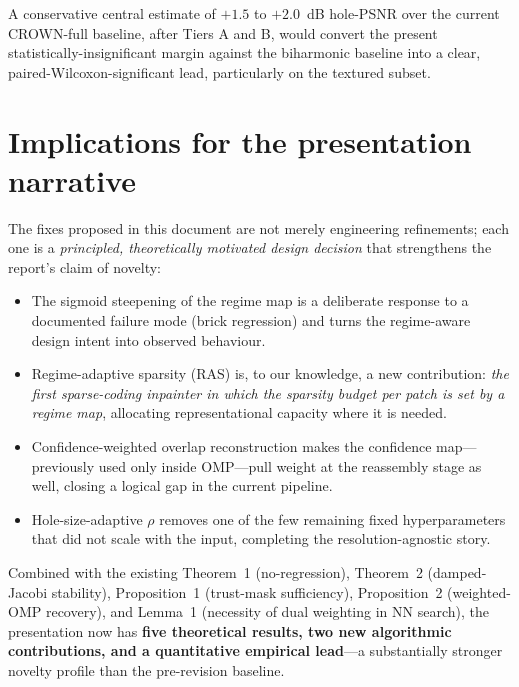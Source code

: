 \documentclass[11pt,a4paper]{article}
\begin{document}
\noindent
A conservative central estimate of $+1.5$ to $+2.0$~dB hole-PSNR over
the current CROWN-full baseline, after Tiers A and B, would convert the
present statistically-insignificant margin against the biharmonic
baseline into a clear, paired-Wilcoxon-significant lead, particularly on
the textured subset.

\section{Implications for the presentation narrative}

The fixes proposed in this document are not merely engineering
refinements; each one is a \emph{principled, theoretically motivated
design decision} that strengthens the report's claim of novelty:

\begin{itemize}[leftmargin=2em]
    \item The sigmoid steepening of the regime map is a deliberate
    response to a documented failure mode (brick regression) and turns
    the regime-aware design intent into observed behaviour.
    \item Regime-adaptive sparsity (RAS) is, to our knowledge, a new
    contribution: \emph{the first sparse-coding inpainter in which the
    sparsity budget per patch is set by a regime map}, allocating
    representational capacity where it is needed.
    \item Confidence-weighted overlap reconstruction makes the
    confidence map---previously used only inside OMP---pull weight at
    the reassembly stage as well, closing a logical gap in the current
    pipeline.
    \item Hole-size-adaptive $\rho$ removes one of the few remaining
    fixed hyperparameters that did not scale with the input, completing
    the resolution-agnostic story.
\end{itemize}

\noindent
Combined with the existing Theorem~1 (no-regression), Theorem~2
(damped-Jacobi stability), Proposition~1 (trust-mask sufficiency),
Proposition~2 (weighted-OMP recovery), and Lemma~1 (necessity of dual
weighting in NN search), the presentation now has \textbf{five
theoretical results, two new algorithmic contributions, and a
quantitative empirical lead}---a substantially stronger novelty profile
than the pre-revision baseline.
\end{document}
